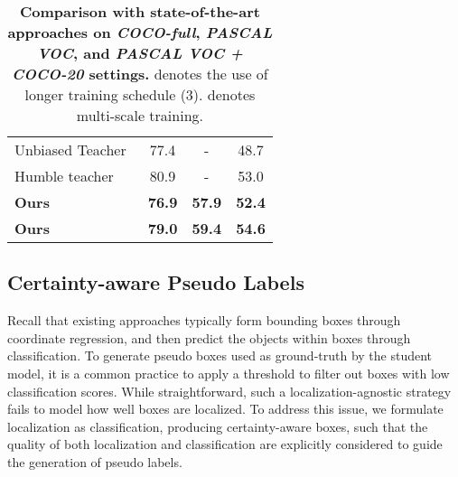 \documentclass[letterpaper]{article} \usepackage{aaai22}  \usepackage{times}  \usepackage{helvet}  \usepackage{courier}  \usepackage[hyphens]{url}  \usepackage{graphicx} \urlstyle{rm} \def\UrlFont{\rm}  \usepackage{natbib}  \usepackage{caption} \DeclareCaptionStyle{ruled}{labelfont=normalfont,labelsep=colon,strut=off} \frenchspacing  \setlength{\pdfpagewidth}{8.5in}  \setlength{\pdfpageheight}{11in}  \usepackage{algorithm}
\begin{document}
\begin{table*}[t]
{{\begin{tabular}{@{}lccc@{}}
    Unbiased Teacher~\citeyearpar{unbiasedteacher} & 77.4 & - & 48.7 \\
    Humble teacher~\citeyearpar{tang2021humble} & 80.9 & - & 53.0 \\
    \midrule
    \textbf{Ours} & \textbf{76.9} & \textbf{57.9} & \textbf{52.4} \\
    \textbf{Ours}  & \textbf{79.0} & \textbf{59.4} & \textbf{54.6} \\
    \bottomrule
    \end{tabular}}}
\hspace{4mm}
\caption{\textbf{Comparison with state-of-the-art approaches on \emph{COCO-full}, \emph{PASCAL VOC}, and \emph{PASCAL VOC + COCO-20} settings.}  denotes the use of longer training schedule (3).  denotes multi-scale training.}
\label{tab:main_full}
\end{table*}


\subsection{Certainty-aware Pseudo Labels} \label{sec:approach_loc}

Recall that existing approaches typically form bounding boxes through coordinate regression, and then predict the objects within boxes through classification.  To generate pseudo boxes used as ground-truth by the student model, it is a common practice to apply a threshold  to filter out boxes with low classification scores. While straightforward, such a localization-agnostic strategy fails to model how well boxes are localized. To address this issue, we formulate localization as classification, producing certainty-aware boxes, such that the quality of both localization and classification are explicitly considered to guide the generation of pseudo labels.
\end{document}
